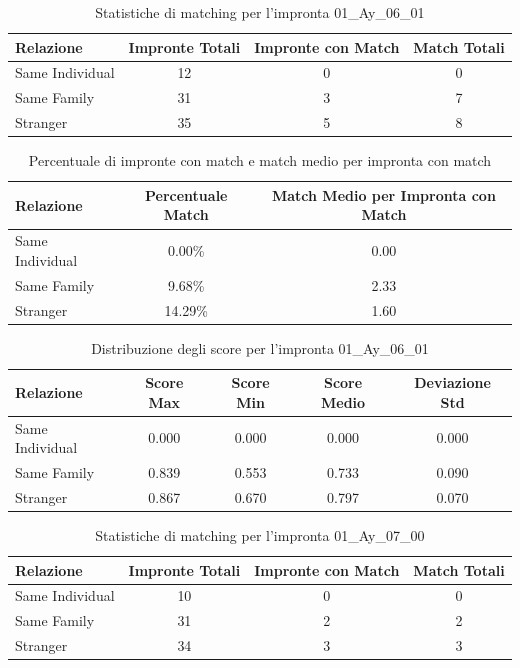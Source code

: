 \begin{table}[htbp]
\centering
\caption{Statistiche di matching per l'impronta 01\_Ay\_06\_01}
\label{tab:results_01_Ay_06_01}
\begin{tabular}{|l|c|c|c|}
\hline
\textbf{Relazione} & \textbf{Impronte Totali} & \textbf{Impronte con Match} & \textbf{Match Totali} \\
\hline
Same Individual & 12 & 0 & 0 \\
\hline
Same Family & 31 & 3 & 7 \\
\hline
Stranger & 35 & 5 & 8 \\
\hline
\end{tabular}
\end{table}


\begin{table}[htbp]
\centering
\caption{Percentuale di impronte con match e match medio per impronta con match}
\label{tab:match_percentage_01_Ay_06_01}
\begin{tabular}{|l|c|c|}
\hline
\textbf{Relazione} & \textbf{Percentuale Match} & \textbf{Match Medio per Impronta con Match} \\
\hline
Same Individual & 0.00\% & 0.00 \\
\hline
Same Family & 9.68\% & 2.33 \\
\hline
Stranger & 14.29\% & 1.60 \\
\hline
\end{tabular}
\end{table}


\begin{table}[htbp]
\centering
\caption{Distribuzione degli score per l'impronta 01\_Ay\_06\_01}
\label{tab:scores_01_Ay_06_01}
\begin{tabular}{|l|c|c|c|c|}
\hline
\textbf{Relazione} & \textbf{Score Max} & \textbf{Score Min} & \textbf{Score Medio} & \textbf{Deviazione Std} \\
\hline
Same Individual & 0.000 & 0.000 & 0.000 & 0.000 \\
\hline
Same Family & 0.839 & 0.553 & 0.733 & 0.090 \\
\hline
Stranger & 0.867 & 0.670 & 0.797 & 0.070 \\
\hline
\end{tabular}
\end{table}


\begin{table}[htbp]
\centering
\caption{Statistiche di matching per l'impronta 01\_Ay\_07\_00}
\label{tab:results_01_Ay_07_00}
\begin{tabular}{|l|c|c|c|}
\hline
\textbf{Relazione} & \textbf{Impronte Totali} & \textbf{Impronte con Match} & \textbf{Match Totali} \\
\hline
Same Individual & 10 & 0 & 0 \\
\hline
Same Family & 31 & 2 & 2 \\
\hline
Stranger & 34 & 3 & 3 \\
\hline
\end{tabular}
\end{table}


